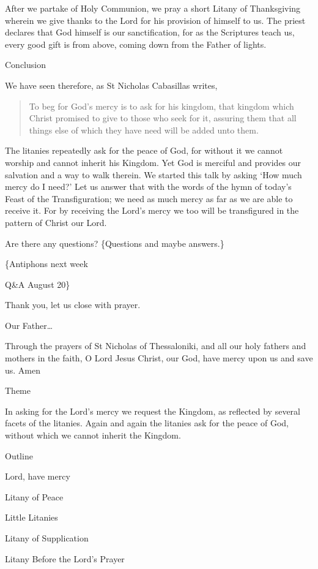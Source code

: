 \documentclass[
]{article}
\newcommand{\RL}[1]{\beginR #1\endR}
\begin{document}
After we partake of Holy Communion, we pray a short Litany of
Thanksgiving wherein we give thanks to the Lord for his provision of
himself to us. The priest declares that God himself is our
sanctification, for as the Scriptures teach us, every good gift is from
above, coming down from the Father of lights.

Conclusion

We have seen therefore, as St Nicholas Cabasillas writes,

\begin{quote}
To beg for God\RL{'}s mercy is to ask for his kingdom, that kingdom
which Christ promised to give to those who seek for it, assuring them
that all things else of which they have need will be added unto them.
\end{quote}

The litanies repeatedly ask for the peace of God, for without it we
cannot worship and cannot inherit his Kingdom. Yet God is merciful and
provides our salvation and a way to walk therein. We started this talk
by asking `How much mercy do I need?' Let us answer that with the words
of the hymn of today's Feast of the Transfiguration; we need as much
mercy as far as we are able to receive it. For by receiving the Lord's
mercy we too will be transfigured in the pattern of Christ our Lord.

Are there any questions? \{Questions and maybe answers.\}

\{Antiphons next week

Q\&A August 20\}

Thank you, let us close with prayer.

Our Father\ldots{}

Through the prayers of St Nicholas of Thessaloniki, and all our holy
fathers and mothers in the faith, O Lord Jesus Christ, our God, have
mercy upon us and save us. Amen

Theme

In asking for the Lord's mercy we request the Kingdom, as reflected by
several facets of the litanies. Again and again the litanies ask for the
peace of God, without which we cannot inherit the Kingdom.

Outline

Lord, have mercy

Litany of Peace

Little Litanies

Litany of Supplication

Litany Before the Lord's Prayer
\end{document}
